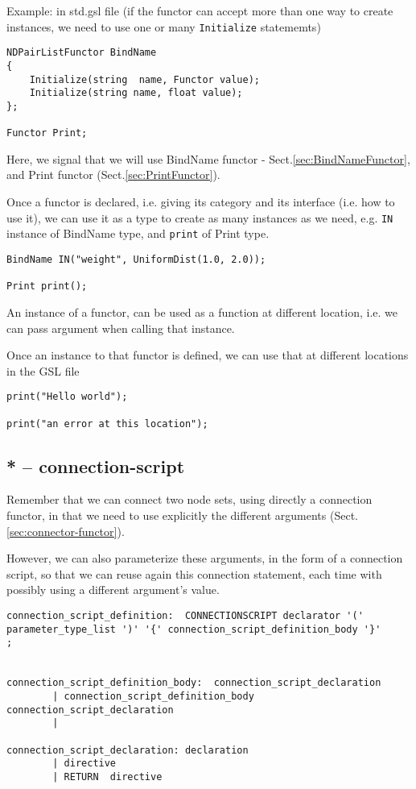 Example: in std.gsl file (if the functor can accept more than one way to create instances, we need to use one or many \verb!Initialize! statememts)
\begin{verbatim}
NDPairListFunctor BindName
{
	Initialize(string  name, Functor value);
	Initialize(string name, float value);
};

Functor Print;
\end{verbatim}
Here, we signal that we will use BindName functor - Sect.\ref{sec:BindNameFunctor}, and Print functor (Sect.\ref{sec:PrintFunctor}).

Once a functor is declared, i.e. giving its category and its interface (i.e. how
to use it), we can use it as a type to create as many instances as we need, e.g.
\verb!IN! instance of BindName type, and \verb!print! of Print type.
\begin{verbatim}
BindName IN("weight", UniformDist(1.0, 2.0));

Print print();
\end{verbatim}
An instance of a functor, can be used as a function at different location, i.e. we can pass argument when calling that instance.

Once an instance to that functor is defined, we can use that at different locations in the GSL file
\begin{verbatim}
print("Hello world");

print("an error at this location");
\end{verbatim}


\subsection{ * -- connection-script}
\label{sec:connection-script}

Remember that we can connect two node sets, using directly a connection functor,
in that we need to use explicitly the different arguments (Sect.\ref{sec:connector-functor}).

However, we can also parameterize these arguments, in the form of a connection
script, so that we can reuse again this connection statement, each time with
possibly using a different argument's value.

\begin{verbatim}
connection_script_definition:  CONNECTIONSCRIPT declarator '(' parameter_type_list ')' '{' connection_script_definition_body '}' 
;


connection_script_definition_body:  connection_script_declaration 
        | connection_script_definition_body  connection_script_declaration 
        |

connection_script_declaration: declaration 
        | directive
        | RETURN  directive
\end{verbatim}


